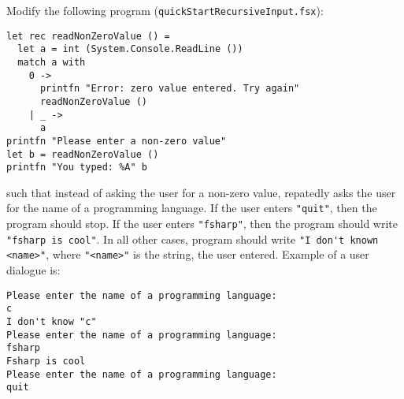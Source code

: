 Modify the following program (\lstinline[language=console]{quickStartRecursiveInput.fsx}):
\begin{lstlisting}
let rec readNonZeroValue () =
  let a = int (System.Console.ReadLine ())
  match a with
    0 ->
      printfn "Error: zero value entered. Try again"
      readNonZeroValue ()
    | _ ->
      a
printfn "Please enter a non-zero value"
let b = readNonZeroValue ()
printfn "You typed: %A" b
\end{lstlisting}
such that instead of asking the user for a non-zero value, repatedly asks the user for the name of a programming language. If the user enters \lstinline{"quit"}, then the program should stop. If the user enters \lstinline{"fsharp"}, then the program should write \lstinline{"fsharp is cool"}. In all other cases, program should write \lstinline{"I don't known <name>"}, where \lstinline{"<name>"} is the string, the user entered. Example of a user dialogue is:
\begin{lstlisting}[language=console]
% dotnet fsi fsharpIsCool.fsx       
Please enter the name of a programming language:
c
I don't know "c"
Please enter the name of a programming language:
fsharp
Fsharp is cool
Please enter the name of a programming language:
quit
\end{lstlisting}
